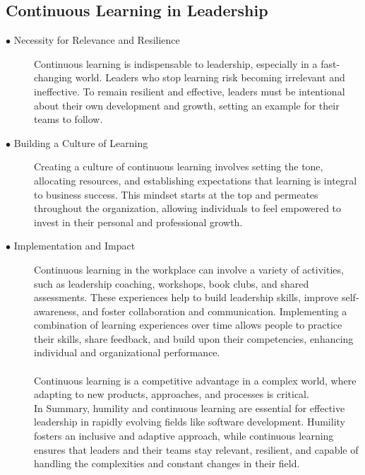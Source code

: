 \documentclass[runningheads]{llncs}
\begin{document}
\subsection{Continuous Learning in Leadership}
\begin{description}
 \item [$\bullet$ Necessity for Relevance and Resilience] Continuous learning is indispensable to leadership, especially in a fast-changing world. Leaders who stop learning risk becoming irrelevant and ineffective. To remain resilient and effective, leaders must be intentional about their own development and growth, setting an example for their teams to follow. \cite{ref_14}\\

 \item [$\bullet$ Building a Culture of Learning] Creating a culture of continuous learning involves setting the tone, allocating resources, and establishing expectations that learning is integral to business success. This mindset starts at the top and permeates throughout the organization, allowing individuals to feel empowered to invest in their personal and professional growth. \cite{ref_19}\\

 \item [$\bullet$ Implementation and Impact] Continuous learning in the workplace can involve a variety of activities, such as leadership coaching, workshops, book clubs, and shared assessments. These experiences help to build leadership skills, improve self-awareness, and foster collaboration and communication. Implementing a combination of learning experiences over time allows people to practice their skills, share feedback, and build upon their competencies, enhancing individual and organizational performance. \cite{ref_20}\\ 
 \\
 Continuous learning is a competitive advantage in a complex world, where adapting to new products, approaches, and processes is critical.\\

In Summary, humility and continuous learning are essential for effective leadership in rapidly evolving fields like software development. Humility fosters an inclusive and adaptive approach, while continuous learning ensures that leaders and their teams stay relevant, resilient, and capable of handling the complexities and constant changes in their field. 


\end{description}
\end{document}
